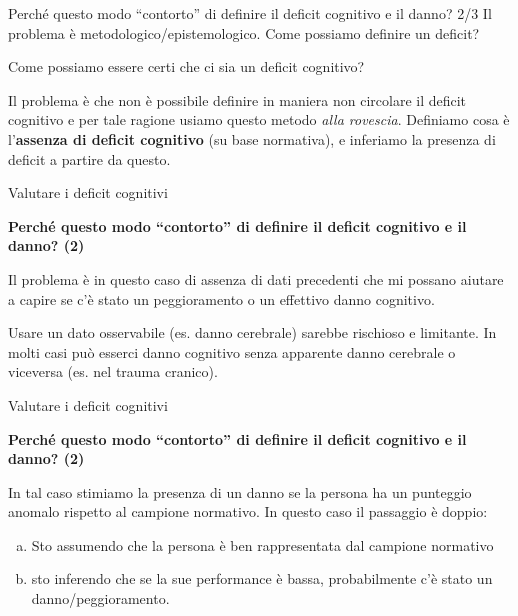 \documentclass[
  ignorenonframetext,
]{beamer}
\begin{document}
\begin{frame}{Perché questo modo ``contorto'' di definire il deficit
cognitivo e il danno? 2/3}
\label{perchuxe9-questo-modo-contorto-di-definire-il-deficit-cognitivo-e-il-danno-23}
Il problema è metodologico/epistemologico. Come possiamo definire un
deficit?

Come possiamo essere certi che ci sia un deficit cognitivo?

Il problema è che non è possibile definire in maniera non circolare il
deficit cognitivo e per tale ragione usiamo questo metodo \emph{alla
rovescia}. Definiamo cosa è l'\textbf{assenza di deficit cognitivo} (su
base normativa), e inferiamo la presenza di deficit a partire da questo.
\end{frame}

\begin{frame}{Valutare i deficit cognitivi}
\label{valutare-i-deficit-cognitivi-8}
\begin{center}
  \textbf{Perché questo modo “contorto” di definire il deficit cognitivo e il danno? (2)}
\end{center}
\vspace{2em}

Il problema è in questo caso di assenza di dati precedenti che mi
possano aiutare a capire se c'è stato un peggioramento o un effettivo
danno cognitivo.

Usare un dato osservabile (es. danno cerebrale) sarebbe rischioso e
limitante. In molti casi può esserci danno cognitivo senza apparente
danno cerebrale o viceversa (es. nel trauma cranico).
\end{frame}

\begin{frame}{Valutare i deficit cognitivi}
\label{valutare-i-deficit-cognitivi-9}
\begin{center}
  \textbf{Perché questo modo “contorto” di definire il deficit cognitivo e il danno? (2)}
\end{center}
\vspace{2em}

In tal caso stimiamo la presenza di un danno se la persona ha un
punteggio anomalo rispetto al campione normativo. In questo caso il
passaggio è doppio:

\begin{enumerate}
[a)]
\item
  Sto assumendo che la persona è ben rappresentata dal campione
  normativo
\item
  sto inferendo che se la sue performance è bassa, probabilmente c'è
  stato un danno/peggioramento.
\end{enumerate}
\end{frame}
\end{document}
